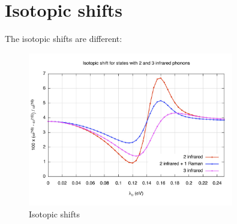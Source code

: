 \section{Isotopic shifts}

The isotopic shifts are different:

\begin{figure}[ht!]
  \centering
  \includegraphics[width=0.8\textwidth]{images/isot-2_3ir.jpg}
  \caption{Isotopic shifts}
  \label{fig:isot-2_3ir}
\end{figure}
